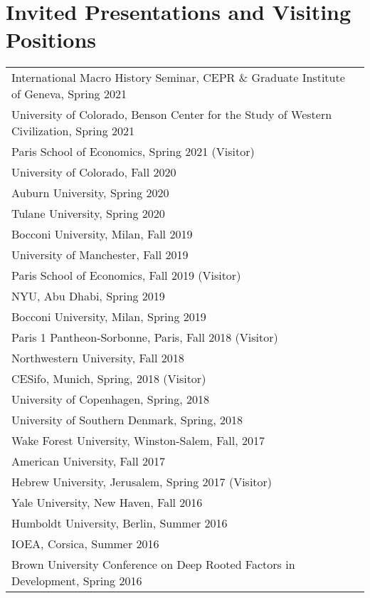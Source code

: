 \documentclass[11pt,fullpage]{article}
\begin{document}
\setlength{\extrarowheight}{1pt}



\section*{Invited Presentations and Visiting Positions}

\begin{tabular}{ll}
	International Macro History Seminar, CEPR \& Graduate Institute of Geneva, Spring 2021 \\
	University of Colorado, Benson Center for the Study of Western Civilization, Spring 2021 \\
	Paris School of Economics, Spring 2021 (Visitor) \\
	University of Colorado, Fall 2020 \\
	Auburn University, Spring 2020 \\
	Tulane University, Spring 2020 \\
	Bocconi University, Milan, Fall 2019 \\
	University of Manchester, Fall 2019 \\
	Paris School of Economics, Fall 2019 (Visitor) \\
	NYU, Abu Dhabi, Spring 2019 \\
	Bocconi University, Milan, Spring 2019  \\
	Paris 1 Pantheon-Sorbonne, Paris, Fall 2018 (Visitor) \\
	Northwestern University, Fall 2018 \\
	CESifo, Munich, Spring, 2018 (Visitor) \\
	University of Copenhagen, Spring, 2018 \\
	University of Southern Denmark, Spring, 2018 \\
	Wake Forest University, Winston-Salem, Fall, 2017 \\
	American University, Fall 2017 \\
	Hebrew University, Jerusalem, Spring 2017 (Visitor) \\
	Yale University, New Haven, Fall 2016\\
	Humboldt University, Berlin, Summer 2016\\
	IOEA, Corsica, Summer 2016\\
	Brown University Conference on Deep Rooted Factors in Development, Spring 2016 \\

\end{tabular}
\end{document}
